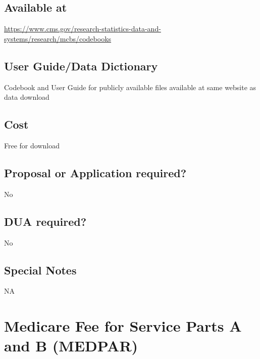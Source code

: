 \documentclass[
]{book}
\begin{document}
\hypertarget{available-at-38}{%
\section{Available at}\label{available-at-38}}

\url{https://www.cms.gov/research-statistics-data-and-systems/research/mcbs/codebooks}

\hypertarget{user-guidedata-dictionary-38}{%
\section{User Guide/Data Dictionary}\label{user-guidedata-dictionary-38}}

Codebook and User Guide for publicly available files available at same website as data download

\hypertarget{cost-38}{%
\section{Cost}\label{cost-38}}

Free for download

\hypertarget{proposal-or-application-required-38}{%
\section{Proposal or Application required?}\label{proposal-or-application-required-38}}

No

\hypertarget{dua-required-38}{%
\section{DUA required?}\label{dua-required-38}}

No

\hypertarget{special-notes-38}{%
\section{Special Notes}\label{special-notes-38}}

NA

\mainmatter

\hypertarget{medicare-fee-for-service-parts-a-and-b-medpar}{%
\chapter{Medicare Fee for Service Parts A and B (MEDPAR)}\label{medicare-fee-for-service-parts-a-and-b-medpar}}
\end{document}
